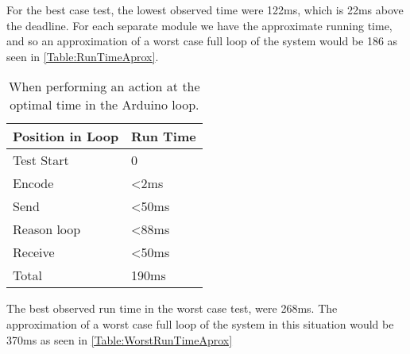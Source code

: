 For the best case test, the lowest observed time were 122ms, which is 22ms above the deadline. For each separate module we have the approximate running time, and so an approximation of a worst case full loop of the system would be 186 as seen in \cref{Table:RunTimeAprox}.
\begin{center}
	\begin{table}[htbp]
	  \centering
	  \begin{tabular}{l l}
		\toprule
		Position in Loop		& Run Time  \\ \midrule
		Test Start		        & 0         \\ \midrule
		Encode 			        & <2ms  	\\ \midrule
		Send   			        & <50ms     \\ \midrule
		Reason loop 	        & <88ms     \\ \midrule
		Receive 		        & <50ms     \\ \midrule \midrule
		Total			        & 190ms	    \\
                                            \bottomrule
	  \end{tabular}
	  \caption[An approximation of a worst case run time of each separate module]{When performing an action at the optimal time in the Arduino loop.}
	\end{table}
 \label{Table:RunTimeAprox}
\end{center}
The best observed run time in the worst case test, were 268ms. The approximation of a worst case full loop of the system in this situation would be 370ms as seen in \cref{Table:WorstRunTimeAprox}

